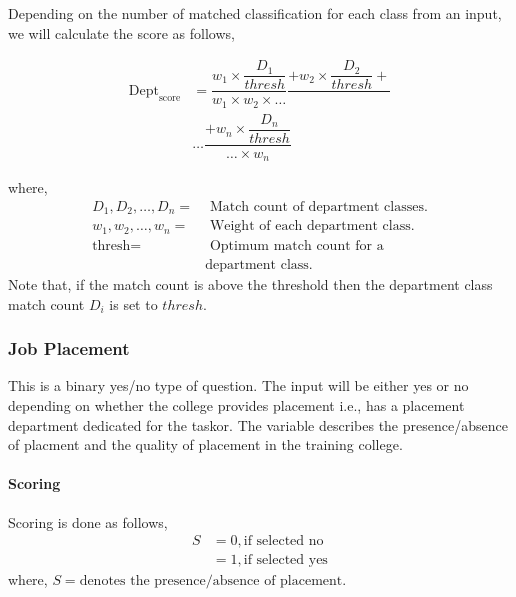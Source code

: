 \documentclass[oneside,twocolumn]{article}
\begin{document}
Depending on the number of matched classification for each
class from an input, we will calculate the score as follows,

\begin{align*}
  \text{Dept}_{\text{score}} &= \dfrac{w_1 \times \dfrac{D_1}{thresh}}{w_1 \times w_2 \times \dots} \dfrac{+ w_2 \times \dfrac{D_2}{thresh} +}{} \\
  &\dots \dfrac{+ w_n \times \dfrac{D_n}{thresh}}{\dots \times w_n}
\end{align*}

where,
\begin{align*}
  D_1, D_2, \dots, D_n =& \text{ Match count of department classes.} \\
  w_1, w_2, \dots, w_n =& \text{ Weight of each department class.} \\
  \text{thresh} =& \text{ Optimum match count for a} \\
                &\text{department class.}
\end{align*}
Note that, if the match count is above the threshold then
the department class match count \(D_i\) is set to \(thresh\).

\subsubsection{Job Placement}
This is a binary yes/no type of question. The input will be
either yes or no depending on whether the college provides
placement i.e., has a placement department dedicated for the
taskor. The variable describes the presence/absence of
placment and the quality of placement in the training college.
\paragraph{Scoring}
Scoring is done as follows,
\begin{align*}
	S &= 0, \text{if selected no} \\
     	  &= 1, \text{if selected yes}
\end{align*}
where, \(S = \text{denotes the presence/absence of placement}\).
\end{document}
